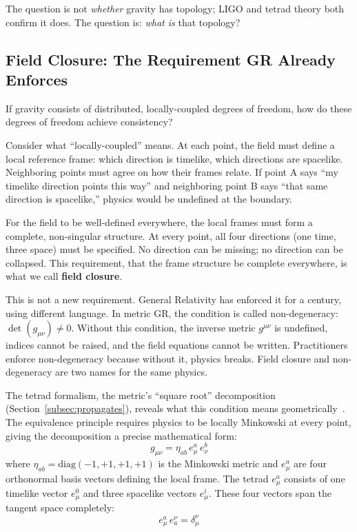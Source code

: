 \documentclass[aps,prd,preprint,superscriptaddress,showpacs,preprintnumbers,amsmath,amssymb,nofootinbib]{revtex4-2}
\begin{document}
The question is not \emph{whether} gravity has topology; LIGO and tetrad theory both confirm it does. The question is: \emph{what is} that topology?

\subsection{Field Closure: The Requirement GR Already Enforces}
\label{subsec:closure}

If gravity consists of distributed, locally-coupled degrees of freedom, how do these degrees of freedom achieve consistency?

Consider what ``locally-coupled'' means. At each point, the field must define a local reference frame: which direction is timelike, which directions are spacelike. Neighboring points must agree on how their frames relate. If point A says ``my timelike direction points this way'' and neighboring point B says ``that same direction is spacelike,'' physics would be undefined at the boundary.

For the field to be well-defined everywhere, the local frames must form a complete, non-singular structure. At every point, all four directions (one time, three space) must be specified. No direction can be missing; no direction can be collapsed. This requirement, that the frame structure be complete everywhere, is what we call \textbf{field closure}.

This is not a new requirement. General Relativity has enforced it for a century, using different language. In metric GR, the condition is called non-degeneracy: $\det(g_{\mu\nu}) \neq 0$. Without this condition, the inverse metric $g^{\mu\nu}$ is undefined, indices cannot be raised, and the field equations cannot be written. Practitioners enforce non-degeneracy because without it, physics breaks. Field closure and non-degeneracy are two names for the same physics.

The tetrad formalism, the metric's ``square root'' decomposition (Section~\ref{subsec:propagates}), reveals what this condition means geometrically~\cite{mtw1973,wald1984}. The equivalence principle requires physics to be locally Minkowski at every point, giving the decomposition a precise mathematical form:
\begin{equation}
g_{\mu\nu} = \eta_{ab}\, e^a_\mu\, e^b_\nu
\label{eq:tetrad}
\end{equation}
where $\eta_{ab} = \text{diag}(-1, +1, +1, +1)$ is the Minkowski metric and $e^a_\mu$ are four orthonormal basis vectors defining the local frame. The tetrad $e^a_\mu$ consists of one timelike vector $e^0_\mu$ and three spacelike vectors $e^i_\mu$. These four vectors span the tangent space completely:
\begin{equation}
e^a_\mu\, e_a^\nu = \delta_\mu^\nu
\end{equation}
\end{document}
